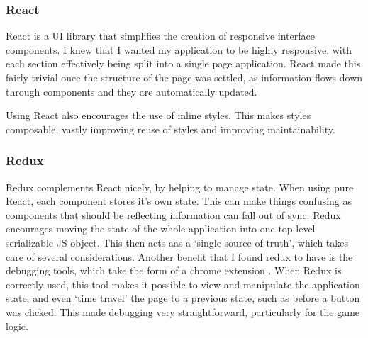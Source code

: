 \subsubsection{React}
React\cite{React} is a UI library that simplifies the creation of responsive interface components. I knew that I wanted my application to be highly responsive, with each section effectively being split into a single page application. React made this fairly trivial once the structure of the page was settled, as information flows down through components and they are automatically updated.

Using React also encourages the use of inline styles. This makes styles composable, vastly improving reuse of styles and improving maintainability.

\subsubsection{Redux}
Redux \cite{Redux} complements React nicely, by helping to manage state. When using pure React, each component stores it's own state. This can make things confusing as components that should be reflecting information can fall out of sync. Redux encourages moving the state of the whole application into one top-level serializable JS object. This then acts aas a `single source of truth', which takes care of several considerations. Another benefit that I found redux to have is the debugging tools, which take the form of a chrome extension \cite{ReduxDev}. When Redux is correctly used, this tool makes it possible to view and manipulate the application state, and even `time travel' the page to a previous state, such as before a button was clicked. This made debugging very straightforward, particularly for the game logic.

